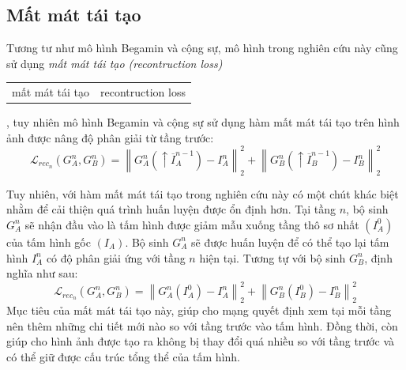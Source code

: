 \documentclass[12pt]{report}%
\newcommand{\word}[2]{%
    \refstepcounter{word}%
    \textit{#1 (#2)}%
    \addcontentsline{wor}{word}
    {\protect
    \begin{tabular}{p{6.2cm}p{6cm}}
        \MakeLowercase{#1} & \MakeLowercase{#2}\\
    \end{tabular}
    }
}
\begin{document}
\subsection{Mất mát tái tạo} %
Tương tư như mô hình Begamin và cộng sự, mô hình trong nghiên cứu này cũng sử dụng \word{mất mát tái tạo}{recontruction loss}, tuy nhiên mô hình Begamin và cộng sự sử dụng hàm mất mát tái tạo trên hình ảnh được nâng độ phân giải  từ  tầng trước: 
\begin{equation}\label{rec_loss}
    {\mathcal{L}_{rec_n}}\left( {G_A ^n}, {G_B ^n} \right) = \left\| {G_A ^n\left( \uparrow{{\overline{I}_A ^{n-1}}} \right) - {I_A ^n}} \right\|_2^2 + \left\| {G_B ^n\left( \uparrow{{\overline{I}_B ^{n-1}}} \right) - {I_B ^n}} \right\|_2^2 
\end{equation}

Tuy nhiên, với hàm mất mát tái tạo trong nghiên cứu này có một chút khác biệt nhằm để cải thiện quá trình huấn luyện được ổn định hơn. Tại tầng $n$, bộ sinh $G_A ^n$ sẽ nhận đầu vào là tấm hình được giảm mẫu xuống tầng thô sơ nhất $\left( I_A ^0 \right)$ của tấm hình gốc $\left(I_A\right)$. Bộ sinh $G_A ^n$ sẽ được huấn luyện để có thể tạo lại tấm hình $I_A ^n$ có độ phân giải ứng với tầng $n$ hiện tại. Tương tự với bộ sinh $G_B ^n$, định nghĩa như sau:
\begin{equation}\label{rec_loss}
    {\mathcal{L}_{rec_n}}\left( {G_A ^n}, {G_B ^n} \right) = \left\| {G_A ^n\left( {{I_A ^0}} \right) - {I_A ^n}} \right\|_2^2 + \left\| {G_B ^n\left( {{I_B ^0}} \right) - {I_B ^n}} \right\|_2^2 
\end{equation}
Mục tiêu của mất mát tái tạo này, giúp cho mạng quyết định xem tại mỗi tầng nên thêm những chi tiết mới nào so với tầng trước vào tấm hình. Đồng thời,  còn giúp cho hình ảnh được tạo ra không bị thay đổi quá nhiều so với tầng trước và  có thể giữ được cấu trúc tổng thể của tấm hình.
\end{document}
